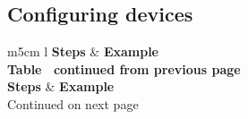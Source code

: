 \documentclass[11pt,a4paper]{report}
\begin{document}
    \subsection{Configuring devices}
        \begin{flushleft}
                \begin{center}
                    \begin{longtable}{ m{5cm} l }
                        \textbf{Steps} & \textbf{Example} \\
                        \hline
                        \endfirsthead
                        {{\bfseries Table \thetable\ continued from previous page}} \\
                        \textbf{Steps} & \textbf{Example} \\
                        \hline
                        \endhead
                        \hline Continued on next page \\
                        \endfoot
                        \endlastfoot


\end{longtable}
\end{center}
\end{flushleft}
\end{document}
